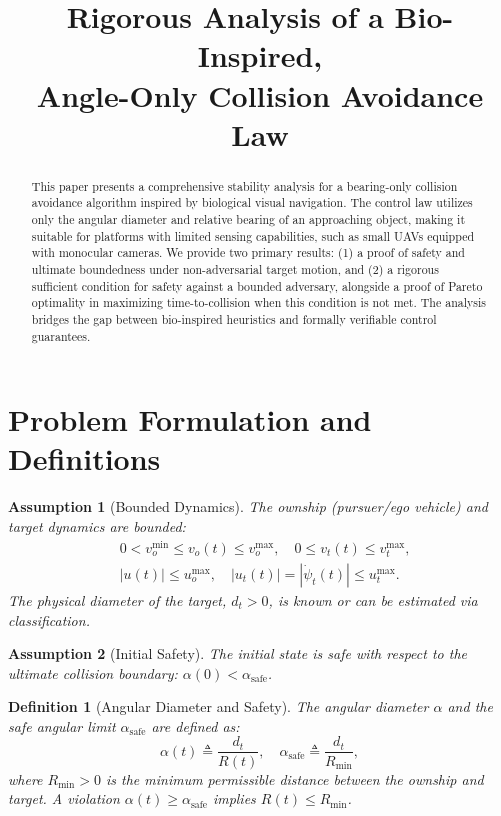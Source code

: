 \documentclass[10pt]{article}
\title{Rigorous Analysis of a Bio-Inspired, \\ Angle-Only Collision Avoidance Law}
\author{}
\date{}
\theoremstyle{plain}
\newtheorem{assumption}{Assumption}
\newtheorem{definition}{Definition}
\begin{document}
\maketitle

\begin{abstract}
This paper presents a comprehensive stability analysis for a bearing-only collision avoidance algorithm inspired by biological visual navigation. The control law utilizes only the angular diameter and relative bearing of an approaching object, making it suitable for platforms with limited sensing capabilities, such as small UAVs equipped with monocular cameras. We provide two primary results: (1) a proof of safety and ultimate boundedness under non-adversarial target motion, and (2) a rigorous sufficient condition for safety against a bounded adversary, alongside a proof of Pareto optimality in maximizing time-to-collision when this condition is not met. The analysis bridges the gap between bio-inspired heuristics and formally verifiable control guarantees.
\end{abstract}

\section{Problem Formulation and Definitions}

\begin{assumption}[Bounded Dynamics]\label{assump:bounds}
    The ownship (pursuer/ego vehicle) and target dynamics are bounded:
    \begin{align*}
        &0 < v_o^{\min} \leq v_o(t) \leq v_o^{\max}, \quad
        0 \leq v_t(t) \leq v_t^{\max}, \\
        &|u(t)| \leq u_o^{\max}, \quad
        |u_t(t)| = |\dot{\psi}_t(t)| \leq u_t^{\max}.
    \end{align*}
    The physical diameter of the target, $d_t > 0$, is known or can be estimated via classification.
\end{assumption}

\begin{assumption}[Initial Safety]\label{assump:init}
    The initial state is safe with respect to the ultimate collision boundary: $\alpha(0) < \alpha_{\text{safe}}$.
\end{assumption}

\begin{definition}[Angular Diameter and Safety]\label{def:alpha}
    The angular diameter $\alpha$ and the safe angular limit $\alpha_{\text{safe}}$ are defined as:
    \[
    \alpha(t) \triangleq \frac{d_t}{R(t)}, \quad \alpha_{\text{safe}} \triangleq \frac{d_t}{R_{\text{min}}},
    \]
    where $R_{\text{min}} > 0$ is the minimum permissible distance between the ownship and target. A violation $\alpha(t) \geq \alpha_{\text{safe}}$ implies $R(t) \leq R_{\text{min}}$.
\end{definition}
\end{document}
